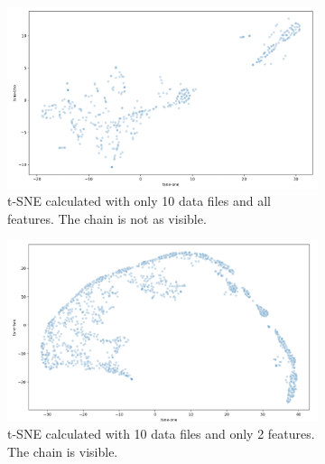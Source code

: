 



\begin{figure}[H]
  \centering
  \begin{subfigure}{.475\textwidth}
    \centering
    \includegraphics[width=1\textwidth]{./images/tsne10Files.png}
    \caption{t-SNE calculated with only 10 data files and all features. The chain is not as visible.}
    \label{figure:tsne10Files}
  \end{subfigure}%
  \hfill
  \begin{subfigure}{.475\textwidth}
    \centering
    \includegraphics[width=1\textwidth]{./images/tsne10Files2Features.png}
    \caption{t-SNE calculated with 10 data files and only 2 features. The chain is visible.}
    \label{figure:tsne10Files2Features}
  \end{subfigure}
	\caption{}
\end{figure}

